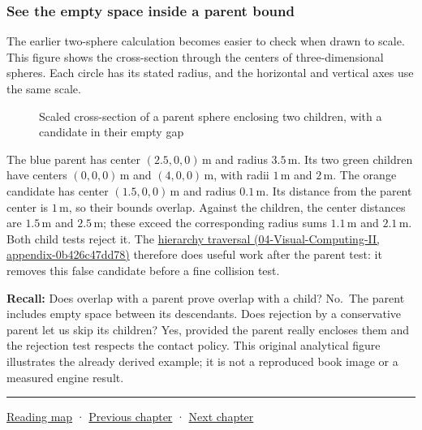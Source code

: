 \subsubsection{See the empty space inside a parent bound}\label{see-the-empty-space-inside-a-parent-bound}

The earlier two-sphere calculation becomes easier to check when drawn to scale. This figure shows the cross-section through the centers of three-dimensional spheres. Each circle has its stated radius, and the horizontal and vertical axes use the same scale.

\begin{figure}
\centering
\pandocbounded{}
\caption{Scaled cross-section of a parent sphere enclosing two children, with a candidate in their empty gap}
\end{figure}

The blue parent has center \((2.5,0,0)\,\mathrm{m}\) and radius \(3.5\,\mathrm{m}\). Its two green children have centers \((0,0,0)\,\mathrm{m}\) and \((4,0,0)\,\mathrm{m}\), with radii \(1\,\mathrm{m}\) and \(2\,\mathrm{m}\). The orange candidate has center \((1.5,0,0)\,\mathrm{m}\) and radius \(0.1\,\mathrm{m}\). Its distance from the parent center is \(1\,\mathrm{m}\), so their bounds overlap. Against the children, the center distances are \(1.5\,\mathrm{m}\) and \(2.5\,\mathrm{m}\); these exceed the corresponding radius sums \(1.1\,\mathrm{m}\) and \(2.1\,\mathrm{m}\). Both child tests reject it. The \href{}{hierarchy traversal (04-Visual-Computing-II, appendix-0b426c47dd78)} therefore does useful work after the parent test: it removes this false candidate before a fine collision test.

\textbf{Recall:} Does overlap with a parent prove overlap with a child? No.~The parent includes empty space between its descendants. Does rejection by a conservative parent let us skip its children? Yes, provided the parent really encloses them and the rejection test respects the contact policy. This original analytical figure illustrates the already derived example; it is not a reproduced book image or a measured engine result.

\begin{center}\rule{0.5\linewidth}{0.5pt}\end{center}

\href{Chapter\%20Edition/03\%20-\%20Game\%20Engine/00\%20-\%20Reading\%20Map}{Reading map} · \hyperref[06-engine-ii-ch032]{Previous chapter} · \hyperref[06-engine-ii-ch034]{Next chapter}
